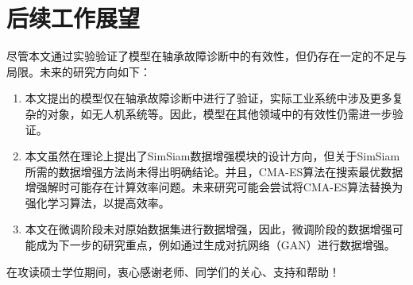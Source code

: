 \documentclass[master]{thesis-uestc}
\begin{document}
\section{后续工作展望}
尽管本文通过实验验证了模型在轴承故障诊断中的有效性，但仍存在一定的不足与局限。未来的研究方向如下：

\begin{enumerate}
    \item 本文提出的模型仅在轴承故障诊断中进行了验证，实际工业系统中涉及更多复杂的对象，如无人机系统等。因此，模型在其他领域中的有效性仍需进一步验证。
    \item 本文虽然在理论上提出了SimSiam数据增强模块的设计方向，但关于SimSiam所需的数据增强方法尚未得出明确结论。并且，CMA-ES算法在搜索最优数据增强解时可能存在计算效率问题。未来研究可能会尝试将CMA-ES算法替换为强化学习算法，以提高效率。
    \item 本文在微调阶段未对原始数据集进行数据增强，因此，微调阶段的数据增强可能成为下一步的研究重点，例如通过生成对抗网络（GAN）进行数据增强。
\end{enumerate}

\thesisacknowledgement
在攻读硕士学位期间，衷心感谢老师、同学们的关心、支持和帮助！

\thesisappendix



%
% 
%
% 
% 
%

\end{document}
